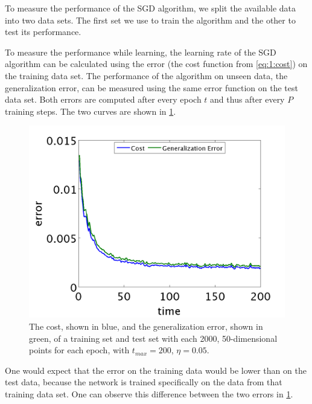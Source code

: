 To measure the performance of the SGD algorithm, we split the available data into two data sets. The first set we use to train the algorithm and the other to test its performance. 

To measure the performance while learning, the learning rate of the SGD algorithm can be calculated using the error (the cost function from \eqref{eq:1:cost}) on the training data set. The performance of the algorithm on unseen data, the generalization error, can be measured using the same error function on the test data set. Both errors are computed after every epoch $t$ and thus after every $P$ training steps. The two curves are shown in \cref{fig:exp:errors}.

\begin{figure}[t]
	\centering
	\includegraphics[width=\columnwidth]{./img/errors_train_2000_test_2000.png}
	\caption{The cost, shown in blue, and the generalization error, shown in green, of a training set and test set with each 2000, 50-dimensional points for each epoch, with $t_{max} = 200$, $\eta = 0.05$.}
	\label{fig:exp:errors}
\end{figure}

One would expect that the error on the training data would be lower than on the test data, because the network is trained specifically on the data from that training data set. One can observe this difference between the two errors in \cref{fig:exp:errors}.

